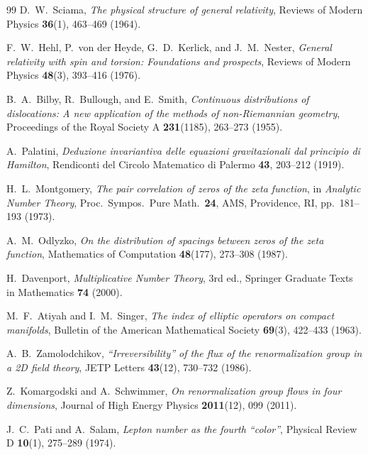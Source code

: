 \documentclass[12pt,a4paper]{article}
\theoremstyle{plain}
\theoremstyle{definition}
\theoremstyle{remark}
\begin{document}
\begin{thebibliography}{99}
D.~W.~Sciama,
\textit{The physical structure of general relativity},
Reviews of Modern Physics \textbf{36}(1), 463--469 (1964).

F.~W.~Hehl, P.~von der Heyde, G.~D.~Kerlick, and J.~M.~Nester,
\textit{General relativity with spin and torsion: Foundations and prospects},
Reviews of Modern Physics \textbf{48}(3), 393--416 (1976).

B.~A.~Bilby, R.~Bullough, and E.~Smith,
\textit{Continuous distributions of dislocations: A new application of the methods of non-Riemannian geometry},
Proceedings of the Royal Society A \textbf{231}(1185), 263--273 (1955).

A.~Palatini,
\textit{Deduzione invariantiva delle equazioni gravitazionali dal principio di Hamilton},
Rendiconti del Circolo Matematico di Palermo \textbf{43}, 203--212 (1919).

H.~L.~Montgomery,
\textit{The pair correlation of zeros of the zeta function},
in \textit{Analytic Number Theory}, Proc.\ Sympos.\ Pure Math.\ \textbf{24},
AMS, Providence, RI, pp.~181--193 (1973).

A.~M.~Odlyzko,
\textit{On the distribution of spacings between zeros of the zeta function},
Mathematics of Computation \textbf{48}(177), 273--308 (1987).

H.~Davenport,
\textit{Multiplicative Number Theory},
3rd ed., Springer Graduate Texts in Mathematics \textbf{74} (2000).

M.~F.~Atiyah and I.~M.~Singer,
\textit{The index of elliptic operators on compact manifolds},
Bulletin of the American Mathematical Society \textbf{69}(3), 422--433 (1963).

A.~B.~Zamolodchikov,
\textit{``Irreversibility'' of the flux of the renormalization group in a 2D field theory},
JETP Letters \textbf{43}(12), 730--732 (1986).

Z.~Komargodski and A.~Schwimmer,
\textit{On renormalization group flows in four dimensions},
Journal of High Energy Physics \textbf{2011}(12), 099 (2011).

J.~C.~Pati and A.~Salam,
\textit{Lepton number as the fourth ``color''},
Physical Review D \textbf{10}(1), 275--289 (1974).


\end{thebibliography}
\end{document}
